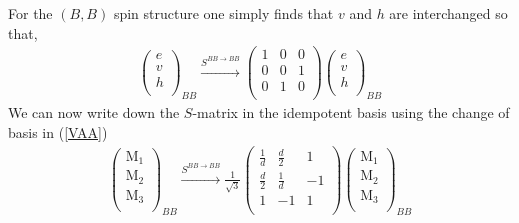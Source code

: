 \documentclass[12pt,a4paper]{article}
\newcounter{arrow}
\begin{document}
For the $(B,B)$ spin structure one simply finds that $v$ and $h$ are interchanged so that,
\begin{align}
\left( \begin{matrix}
e\\
v\\
h\\
\end{matrix} \right)_{BB}
\xrightarrow{S^{BB \rightarrow BB}}
\left(\begin{matrix}
1& 0& 0 \\
0& 0&1  \\
0&1 &0 \\ 
\end{matrix} \right)
\left( \begin{matrix}
e\\
v\\
h\\
\end{matrix} \right)_{BB}
\end{align}
We can now write down the $S$-matrix in the idempotent basis using the change of basis in (\ref{VAA})
\begin{align}
\left( \begin{matrix}
\text{M}_1\\
\text{M}_2\\
\text{M}_3\\
\end{matrix} \right)_{BB} \xrightarrow{S^{BB \rightarrow BB}} 
\frac{1}{\sqrt{3}}\left( \begin{matrix}
\frac{1}{d} & \frac{d}{2} & 1\\ 
\frac{d}{2} & \frac{1}{d} & -1\\
1 & -1 & 1\\
\end{matrix} \right)
\left( \begin{matrix}
\text{M}_1\\
\text{M}_2\\
\text{M}_3\\
\end{matrix} \right)_{BB}
\end{align}
\end{document}
